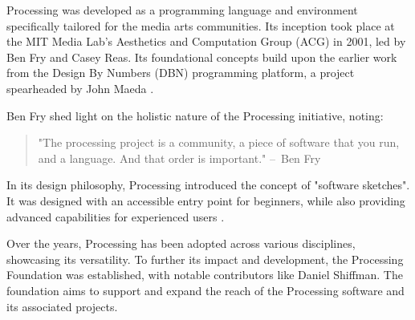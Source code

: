 \documentclass[draft]{article}
\begin{document}
Processing was developed as a programming language and environment specifically tailored for the media arts communities. Its inception took place at the MIT Media Lab's Aesthetics and Computation Group (ACG) in 2001, led by Ben Fry and Casey Reas. Its foundational concepts build upon the earlier work from the Design By Numbers (DBN) programming platform, a project spearheaded by John Maeda \parencite{fryModernPrometheusHistory2018}.

Ben Fry shed light on the holistic nature of the Processing initiative, noting:
\begin{quote}
"The processing project is a community, a piece of software that you run, and a language. And that order is important." – Ben Fry \parencite[19:22]{artsatmit2017CASTSymposium2017}
\end{quote}

In its design philosophy, Processing introduced the concept of "software sketches". It was designed with an accessible entry point for beginners, while also providing advanced capabilities for experienced users \parencite{reasProcessingProgrammingMedia2006}.

Over the years, Processing has been adopted across various disciplines, showcasing its versatility. To further its impact and development, the Processing Foundation was established, with notable contributors like Daniel Shiffman. The foundation aims to support and expand the reach of the Processing software and its associated projects.



\end{document}
